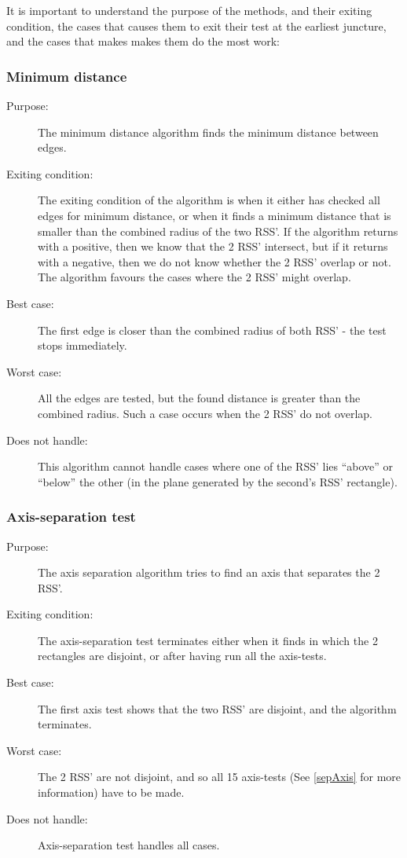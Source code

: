 It is important to understand the purpose of the methods, and their exiting condition, the cases that causes them to exit their test at the earliest juncture, and the cases that makes makes them do the most work:

\subsubsection{Minimum distance}
\begin{description}
\item[Purpose:] The minimum distance algorithm finds the minimum distance between edges.
\item[Exiting condition:]The exiting condition of the algorithm is when it either has checked all edges for minimum distance, or when it finds a minimum distance that is smaller than the combined radius of the two RSS'. If the algorithm returns with a positive, then we know that the 2 RSS' intersect, but if it returns with a negative, then we do not know whether the 2 RSS' overlap or not. The algorithm favours the cases where the 2 RSS' might overlap.
\item[Best case:] The first edge is closer than the combined radius of both RSS' - the test stops immediately.
\item[Worst case:] All the edges are tested, but the found distance is greater than the combined radius. Such a case occurs when the 2 RSS' do not overlap.
\item[Does not handle:] This algorithm cannot handle cases where one of the RSS' lies ``above'' or ``below'' the other (in the plane generated by the second's RSS' rectangle).
\end{description}

\subsubsection{Axis-separation test}
\begin{description}
\item[Purpose:] The axis separation algorithm tries to find an axis that separates the 2 RSS'. 
\item[Exiting condition:] The axis-separation test terminates either when it finds in which the 2 rectangles are disjoint, or after having run all the axis-tests.
\item[Best case:] The first axis test shows that the two RSS' are disjoint, and the algorithm terminates. 
\item[Worst case:] The 2 RSS' are not disjoint, and so all 15 axis-tests (See \ref{sepAxis} for more information) have to be made.
\item[Does not handle:] Axis-separation test handles all cases.
\end{description}

